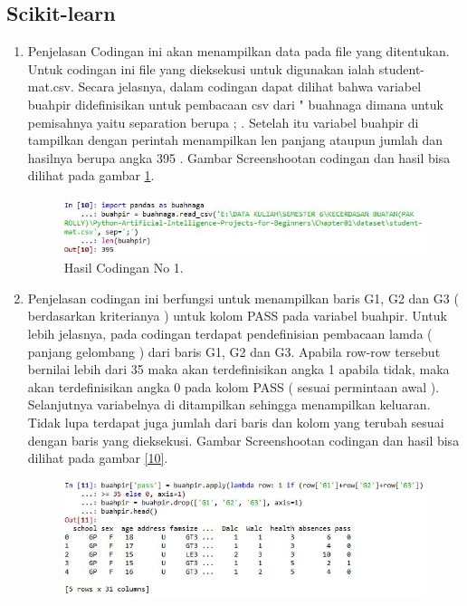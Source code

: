 \subsection{Scikit-learn}
\begin{enumerate}
\item Penjelasan Codingan ini akan menampilkan data pada file yang ditentukan. Untuk codingan ini file yang dieksekusi untuk digunakan ialah student-mat.csv. Secara jelasnya, dalam codingan dapat dilihat bahwa variabel buahpir didefinisikan untuk pembacaan csv dari " buahnaga  dimana untuk pemisahnya yaitu separation berupa ; . Setelah itu variabel buahpir di tampilkan dengan perintah menampilkan len panjang ataupun jumlah dan hasilnya berupa angka 395 . 
\subitem Gambar Screenshootan codingan dan hasil bisa dilihat pada gambar \ref{9}.
\begin{figure}[ht]
		\centerline{\includegraphics[width=1\textwidth]{figures/huda/1_hari4.JPG}}
		\caption{Hasil Codingan No 1.}
		\label{9}
\end{figure}
\item Penjelasan codingan ini berfungsi untuk menampilkan  baris  G1, G2 dan G3 ( berdasarkan kriterianya ) untuk kolom PASS pada variabel buahpir. Untuk lebih jelasnya, pada codingan terdapat pendefinisian pembacaan lamda ( panjang gelombang ) dari baris G1, G2 dan G3. Apabila row-row tersebut bernilai lebih dari 35 maka akan terdefinisikan angka 1 apabila tidak, maka akan terdefinisikan angka 0 pada kolom PASS ( sesuai permintaan awal ). Selanjutnya variabelnya di ditampilkan sehingga menampilkan keluaran. Tidak lupa terdapat juga jumlah dari baris dan kolom yang terubah sesuai dengan baris yang dieksekusi.
\subitem Gambar Screenshootan codingan dan hasil bisa dilihat pada gambar \ref{10}.
\begin{figure}[ht]
		\centerline{\includegraphics[width=1\textwidth]{figures/huda/2_hari4.JPG}}

\end{figure}
\end{enumerate}

